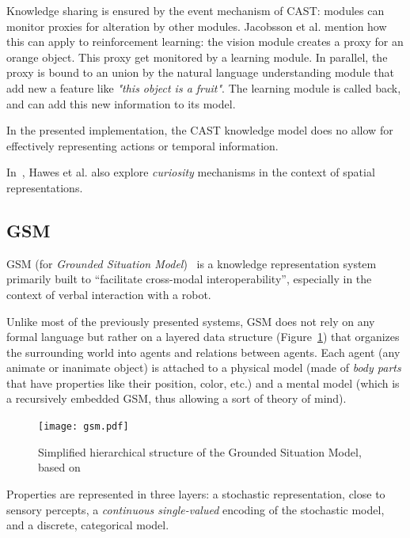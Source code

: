 \documentclass[a4paper, twocolumn]{article}
\begin{document}
Knowledge sharing is ensured by the event mechanism of CAST: modules can
monitor proxies for alteration by other modules. Jacobsson et al. mention how
this can apply to reinforcement learning: the vision module creates a proxy for
an orange object. This proxy get monitored by a learning module. In parallel,
the proxy is bound to an union by the natural language understanding module
that add new a feature like \emph{"this object is a fruit"}. The learning
module is called back, and can add this new information to its model.

In the presented implementation, the CAST knowledge model does no allow for
effectively representing actions or temporal information.

In~\cite{Hawes2011}, Hawes et al. also explore \emph{curiosity} mechanisms in
the context of spatial representations.

\subsection{GSM}
\label{sect|gsm}

GSM (for \emph{Grounded Situation Model})~\cite{Mavridis2006} is a knowledge
representation system primarily built to ``facilitate cross-modal
interoperability'',  especially in the context of verbal interaction with a
robot.

Unlike most of the previously presented systems, GSM does not rely on any
formal language but rather on a layered data structure (Figure~\ref{fig|gsm})
that organizes the surrounding world into agents and relations between agents.
Each agent (any animate or inanimate object) is attached to a physical model (made
of \emph{body parts} that have properties like their position, color, etc.) and
a mental model (which is a recursively embedded GSM, thus allowing a sort of
theory of mind).

\begin{figure}
    \centering
    \texttt{[image: gsm.pdf]}

    \caption{Simplified hierarchical structure of the Grounded Situation Model,
    based on~\cite{Mavridis2006}}

    \label{fig|gsm}
\end{figure}

Properties are represented in three layers: a stochastic representation, close
to sensory percepts, a \emph{continuous single-valued} encoding of the
stochastic model, and a discrete, categorical model.
\end{document}
